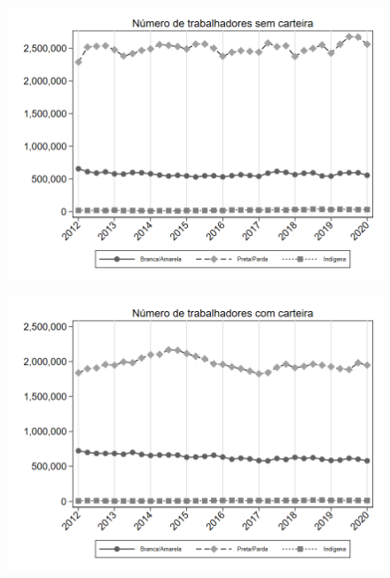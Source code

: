 \begin{frame}[label=_composicao_demografica_raca_n_empregadoSC]{}
\textit{\hyperlink{_composicao_demografica_raca}{}}
\begin{figure}
  \centering
  \includegraphics[width=1.0\linewidth]{../../analysis/output/composicao_demografica/raca/_composicao_demografica_raca_n_empregadoSC.png}
  \caption{}
  \label{fig:_composicao_demografica_raca_n_empregadoSC}
\end{figure}
\end{frame}

\begin{frame}[label=_composicao_demografica_raca_n_empregadoCC]{}
\textit{\hyperlink{_composicao_demografica_raca}{}}
\begin{figure}
  \centering
  \includegraphics[width=1.0\linewidth]{../../analysis/output/composicao_demografica/raca/_composicao_demografica_raca_n_empregadoCC.png}
  \caption{}
  \label{fig:_composicao_demografica_raca_n_empregadoCC}
\end{figure}
\end{frame}

